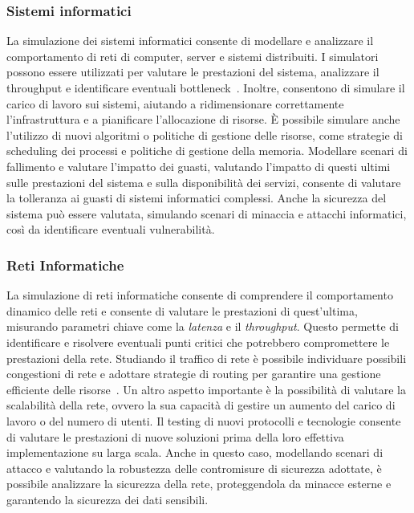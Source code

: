 \documentclass[12pt,a4paper,openright,twoside]{book}
\begin{document}
\subsubsection{Sistemi informatici}
La simulazione dei sistemi informatici consente di modellare e analizzare il comportamento di reti di computer, server e sistemi distribuiti. 
I simulatori possono essere utilizzati per valutare le prestazioni del sistema, analizzare il throughput e identificare eventuali bottleneck~\cite{LEROUDIER197950}. Inoltre, consentono di simulare il carico di lavoro sui sistemi, aiutando a ridimensionare correttamente l'infrastruttura e a pianificare l'allocazione di risorse. 
È possibile simulare anche l'utilizzo di nuovi algoritmi o politiche di gestione delle risorse, come strategie di scheduling dei processi e politiche di gestione della memoria.
Modellare scenari di fallimento e valutare l'impatto dei guasti, valutando l'impatto di questi ultimi sulle prestazioni del sistema e sulla disponibilità dei servizi, consente di valutare la tolleranza ai guasti di sistemi informatici complessi. 
Anche la sicurezza del sistema può essere valutata, simulando scenari di minaccia e attacchi informatici, così da identificare eventuali vulnerabilità.

\subsubsection{Reti Informatiche}
La simulazione di reti informatiche consente di comprendere il comportamento dinamico delle reti e consente di valutare le prestazioni di quest'ultima, misurando parametri chiave come la \textit{latenza} e il \textit{throughput}. Questo permette di identificare e risolvere eventuali punti critici che potrebbero compromettere le prestazioni della rete. 
Studiando il traffico di rete è possibile individuare possibili congestioni di rete e adottare strategie di routing per garantire una gestione efficiente delle risorse~\cite{Varga2003THEOD}. 
Un altro aspetto importante è la possibilità di valutare la scalabilità della rete, ovvero la sua capacità di gestire un aumento del carico di lavoro o del numero di utenti. 
Il testing di nuovi protocolli e tecnologie consente di valutare le prestazioni di nuove soluzioni prima della loro effettiva implementazione su larga scala. 
Anche in questo caso, modellando scenari di attacco e valutando la robustezza delle contromisure di sicurezza adottate, è possibile analizzare la sicurezza della rete, proteggendola da minacce esterne e garantendo la sicurezza dei dati sensibili. 
\end{document}
